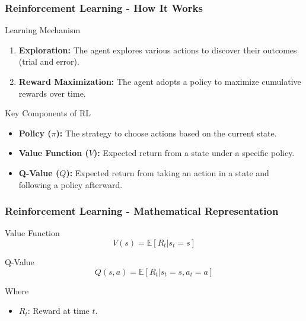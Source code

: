 \documentclass[aspectratio=169]{beamer}
\begin{document}
\begin{frame}[fragile]
    \frametitle{Reinforcement Learning - How It Works}
    \begin{block}{Learning Mechanism}
        \begin{enumerate}
            \item \textbf{Exploration:} The agent explores various actions to discover their outcomes (trial and error).
            \item \textbf{Reward Maximization:} The agent adopts a policy to maximize cumulative rewards over time.
        \end{enumerate}
    \end{block}

    \begin{block}{Key Components of RL}
        \begin{itemize}
            \item \textbf{Policy ($\pi$):} The strategy to choose actions based on the current state.
            \item \textbf{Value Function ($V$):} Expected return from a state under a specific policy.

            \item \textbf{Q-Value ($Q$):} Expected return from taking an action in a state and following a policy afterward.
        \end{itemize}
    \end{block}
\end{frame}

\begin{frame}[fragile]
    \frametitle{Reinforcement Learning - Mathematical Representation}
    \begin{block}{Value Function}
        \begin{equation}
            V(s) = \mathbb{E} \left[ R_t | s_t = s \right]
        \end{equation}
    \end{block}

    \begin{block}{Q-Value}
        \begin{equation}
            Q(s, a) = \mathbb{E} \left[ R_t | s_t = s, a_t = a \right]
        \end{equation}
    \end{block}

    \begin{block}{Where}
        \begin{itemize}
            \item $R_t$: Reward at time $t$.
        \end{itemize}
    \end{block}
\end{frame}
\end{document}
